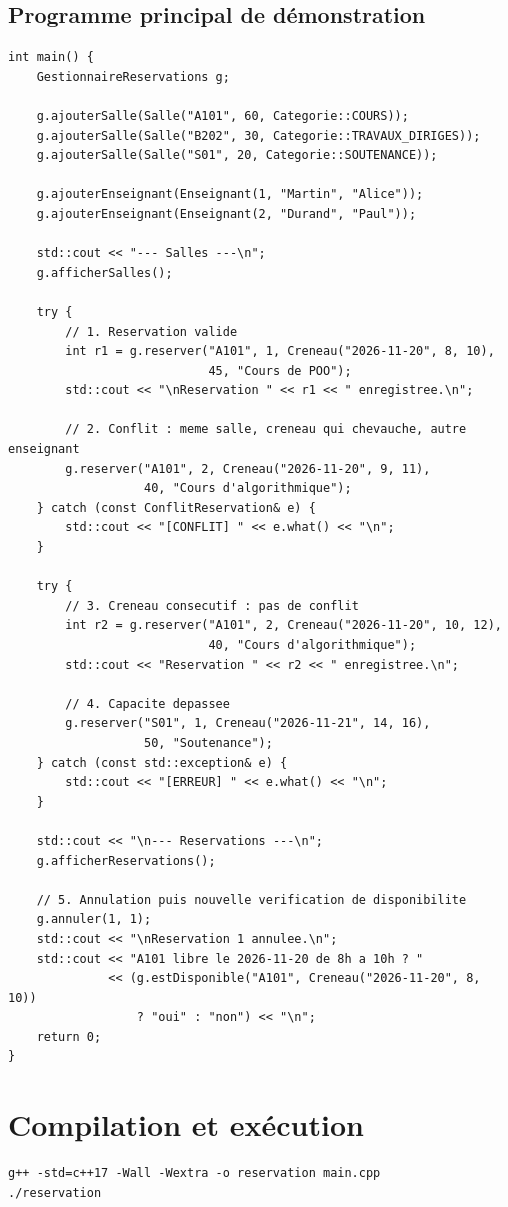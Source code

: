 \documentclass[12pt,a4paper]{report}
\begin{document}
\subsection{Programme principal de démonstration}
\begin{lstlisting}[style=cppstyle]
int main() {
    GestionnaireReservations g;

    g.ajouterSalle(Salle("A101", 60, Categorie::COURS));
    g.ajouterSalle(Salle("B202", 30, Categorie::TRAVAUX_DIRIGES));
    g.ajouterSalle(Salle("S01", 20, Categorie::SOUTENANCE));

    g.ajouterEnseignant(Enseignant(1, "Martin", "Alice"));
    g.ajouterEnseignant(Enseignant(2, "Durand", "Paul"));

    std::cout << "--- Salles ---\n";
    g.afficherSalles();

    try {
        // 1. Reservation valide
        int r1 = g.reserver("A101", 1, Creneau("2026-11-20", 8, 10),
                            45, "Cours de POO");
        std::cout << "\nReservation " << r1 << " enregistree.\n";

        // 2. Conflit : meme salle, creneau qui chevauche, autre enseignant
        g.reserver("A101", 2, Creneau("2026-11-20", 9, 11),
                   40, "Cours d'algorithmique");
    } catch (const ConflitReservation& e) {
        std::cout << "[CONFLIT] " << e.what() << "\n";
    }

    try {
        // 3. Creneau consecutif : pas de conflit
        int r2 = g.reserver("A101", 2, Creneau("2026-11-20", 10, 12),
                            40, "Cours d'algorithmique");
        std::cout << "Reservation " << r2 << " enregistree.\n";

        // 4. Capacite depassee
        g.reserver("S01", 1, Creneau("2026-11-21", 14, 16),
                   50, "Soutenance");
    } catch (const std::exception& e) {
        std::cout << "[ERREUR] " << e.what() << "\n";
    }

    std::cout << "\n--- Reservations ---\n";
    g.afficherReservations();

    // 5. Annulation puis nouvelle verification de disponibilite
    g.annuler(1, 1);
    std::cout << "\nReservation 1 annulee.\n";
    std::cout << "A101 libre le 2026-11-20 de 8h a 10h ? "
              << (g.estDisponible("A101", Creneau("2026-11-20", 8, 10))
                  ? "oui" : "non") << "\n";
    return 0;
}
\end{lstlisting}

\section{Compilation et exécution}
\begin{lstlisting}[style=plain]
g++ -std=c++17 -Wall -Wextra -o reservation main.cpp
./reservation
\end{lstlisting}
\end{document}
